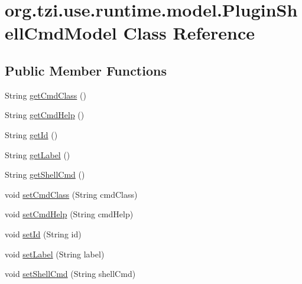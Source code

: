 \hypertarget{classorg_1_1tzi_1_1use_1_1runtime_1_1model_1_1_plugin_shell_cmd_model}{\section{org.\-tzi.\-use.\-runtime.\-model.\-Plugin\-Shell\-Cmd\-Model Class Reference}
\label{classorg_1_1tzi_1_1use_1_1runtime_1_1model_1_1_plugin_shell_cmd_model}
}
\subsection*{Public Member Functions}
\begin{DoxyCompactItemize}
\item 
String \hyperlink{classorg_1_1tzi_1_1use_1_1runtime_1_1model_1_1_plugin_shell_cmd_model_a8eaf45237fa6cbf012ca7f866d1fb038}{get\-Cmd\-Class} ()
\item 
String \hyperlink{classorg_1_1tzi_1_1use_1_1runtime_1_1model_1_1_plugin_shell_cmd_model_a2f9d3d3c6100b7a36dae19cb756d42dd}{get\-Cmd\-Help} ()
\item 
String \hyperlink{classorg_1_1tzi_1_1use_1_1runtime_1_1model_1_1_plugin_shell_cmd_model_a12ff725d9f4e721640ddd39f77fe8b31}{get\-Id} ()
\item 
String \hyperlink{classorg_1_1tzi_1_1use_1_1runtime_1_1model_1_1_plugin_shell_cmd_model_a563f05f64da80b2f302fe4cef5aa29f9}{get\-Label} ()
\item 
String \hyperlink{classorg_1_1tzi_1_1use_1_1runtime_1_1model_1_1_plugin_shell_cmd_model_a5d3c5ffd7096fc6a2265cfa1c7388640}{get\-Shell\-Cmd} ()
\item 
void \hyperlink{classorg_1_1tzi_1_1use_1_1runtime_1_1model_1_1_plugin_shell_cmd_model_aab2a2412edba37f190461e68e31b902a}{set\-Cmd\-Class} (String cmd\-Class)
\item 
void \hyperlink{classorg_1_1tzi_1_1use_1_1runtime_1_1model_1_1_plugin_shell_cmd_model_a6a3d752e56e54e947c550d741024d5e1}{set\-Cmd\-Help} (String cmd\-Help)
\item 
void \hyperlink{classorg_1_1tzi_1_1use_1_1runtime_1_1model_1_1_plugin_shell_cmd_model_a122380e8e9c3782bcfdefc8d0b4e1b95}{set\-Id} (String id)
\item 
void \hyperlink{classorg_1_1tzi_1_1use_1_1runtime_1_1model_1_1_plugin_shell_cmd_model_afb71bf2e964832e1d60d30d5890fb442}{set\-Label} (String label)
\item 
void \hyperlink{classorg_1_1tzi_1_1use_1_1runtime_1_1model_1_1_plugin_shell_cmd_model_a5355c24187c968447ecc7b716a131446}{set\-Shell\-Cmd} (String shell\-Cmd)
\end{DoxyCompactItemize}


